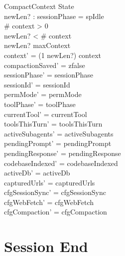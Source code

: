 \documentclass[a4paper,10pt,fleqn]{article}
\begin{document}
\begin{schema}{CompactContext}
  \Delta State \\
  newLen? : \nat
  \where
  sessionPhase = spIdle \\
  \# context > 0 \\
  newLen? < \# context \\
  newLen? \leq maxContext \\
  context' = (1 \upto newLen?) \dres context \\
  compactionSaved' = zfalse \\
  sessionPhase' = sessionPhase \\
  sessionId' = sessionId \\
  permMode' = permMode \\
  toolPhase' = toolPhase \\
  currentTool' = currentTool \\
  toolsThisTurn' = toolsThisTurn \\
  activeSubagents' = activeSubagents \\
  pendingPrompt' = pendingPrompt \\
  pendingResponse' = pendingResponse \\
  codebaseIndexed' = codebaseIndexed \\
  activeDb' = activeDb \\
  capturedUrls' = capturedUrls \\
  cfgSessionSync' = cfgSessionSync \\
  cfgWebFetch' = cfgWebFetch \\
  cfgCompaction' = cfgCompaction
\end{schema}

\section{Session End}
\end{document}
